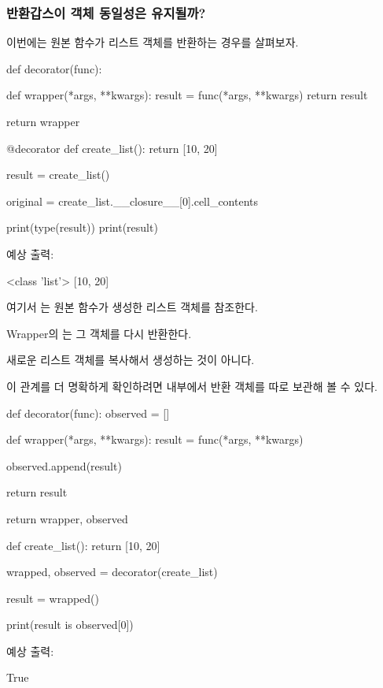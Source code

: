 \subsubsection{반환갑스이 객체 동일성은 유지될까?}

이번에는 원본 함수가 리스트 객체를 반환하는 경우를 살펴보자.

\begin{dhkcode}
def decorator(func):

    def wrapper(*args, **kwargs):
        result = func(*args, **kwargs)
        return result

    return wrapper


@decorator
def create_list():
    return [10, 20]


result = create_list()

original = create_list.__closure__[0].cell_contents

print(type(result))
print(result)
\end{dhkcode}

예상 출력:

\begin{dhkzsh}
<class 'list'>
[10, 20]
\end{dhkzsh}

여기서 는 원본 함수가 생성한 리스트 객체를 참조한다.

Wrapper의 는 그 객체를 다시 반환한다.

새로운 리스트 객체를 복사해서 생성하는 것이 아니다.

이 관계를 더 명확하게 확인하려면  내부에서 반환 객체를 따로 보관해 볼 수 있다.

\begin{dhkcode}
def decorator(func):
    observed = []

    def wrapper(*args, **kwargs):
        result = func(*args, **kwargs)

        observed.append(result)

        return result

    return wrapper, observed


def create_list():
    return [10, 20]


wrapped, observed = decorator(create_list)

result = wrapped()

print(result is observed[0])
\end{dhkcode}

예상 출력:

\begin{dhkzsh}
True
\end{dhkzsh}

